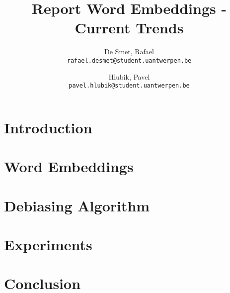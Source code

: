 \documentclass[a4paper,12pt]{article}
\begin{document}
\title{Report Word Embeddings - Current Trends}
\author{
  De Smet, Rafael\\
  \texttt{rafael.desmet@student.uantwerpen.be}
  \and
  Hlubik, Pavel\\
  \texttt{pavel.hlubik@student.uantwerpen.be}
}
\date{}
\maketitle

\section{Introduction}

\section{Word Embeddings}

\section{Debiasing Algorithm}

\section{Experiments}

\section{Conclusion}
\end{document}
